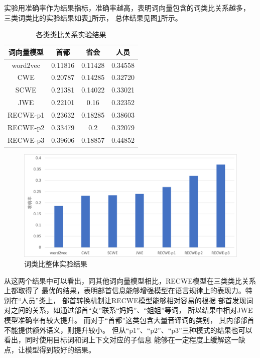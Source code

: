 \documentclass{standalone}
\begin{document}
实验用准确率作为结果指标，准确率越高，表明词向量包含的词类比关系越多，
三类词类比的实验结果如表\ref{word_analogy_resutl}所示，
总体结果见图\ref{word_analogy_all_resutl}所示。
\begin{table}[ht]
    \caption{各类类比关系实验结果}
    \begin{tabular}{|c|c|c|c|}
        \hline
        词向量模型 & 首都 & 省会 & 人员 \\
        \hline
        word2vec & 0.11816 & 0.11428 & 0.34558 \\
        \hline
        CWE & 0.20787 & 0.14285 & 0.32720 \\
        \hline
        SCWE & 0.21381 & 0.14022 & 0.33021 \\
        \hline
        JWE & 0.22101 & 0.16 & 0.32352 \\
        \hline
        RECWE-p1 & 0.23632 & 0.18285 & 0.38603 \\
        \hline
        RECWE-p2 & 0.33479 & 0.2 & 0.32079 \\
        \hline
        RECWE-p3 & 0.39606 & 0.18857 & 0.44852 \\
        \hline
    \end{tabular}
    \label{word_analogy_resutl}
    \end{table}

\begin{figure}[!h]
    \includegraphics[scale=0.45]{picture/word_analogy_result.pdf}
    \caption{词类比整体实验结果}
    \label{word_analogy_all_resutl}
\end{figure}

从这两个结果中可以看出，同其他词向量模型相比，RECWE模型在三类类比关系上都取得了
最优的结果，表明部首信息能够增强模型在语言规律上的表现力。特别在“人员”类上，
部首转换机制让RECWE模型能够相对容易的根据
部首发现词对之间的关系，如通过部首“女”联系“妈妈”、“姐姐”等词，
所以结果中相对JWE模型准确率有较大提升。
而对于“首都”这类包含大量音译词的类别，
其内部部首不能提供额外语义，则提升较小。
但从“p1”、“p2”、“p3”三种模式的结果也可以看出，同时使用目标词和词上下文对应的子信息
能够在一定程度上缓解这一缺点，让模型得到较好的结果。
\end{document}
